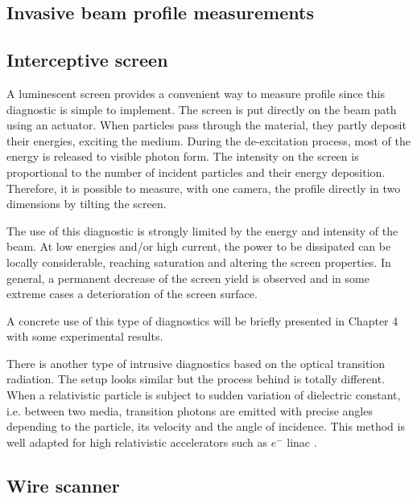 \begin{refsection}

  \section{Invasive beam profile measurements}
  \subsection{Interceptive screen}
  A luminescent screen provides a convenient way to measure profile since this diagnostic is simple to implement. The screen is put directly on the beam path using an actuator. When particles pass through the material, they partly deposit their energies, exciting the medium. During the de-excitation process, most of the energy is released to visible photon form. The intensity on the screen is proportional to the number of incident particles and their energy deposition. Therefore, it is possible to measure, with one camera, the profile directly in two dimensions by tilting the screen.

  The use of this diagnostic is strongly limited by the energy and intensity of the beam. At low energies and/or high current, the power to be dissipated can be locally considerable, reaching saturation and altering the screen properties. In general, a permanent decrease of the screen yield is observed \cite{Simon:IBIC2016-MOPG79} and in some extreme cases a deterioration of the screen surface.

  A concrete use of this type of diagnostics will be briefly presented in Chapter 4 with some experimental results.

  There is another type of intrusive diagnostics based on the optical transition radiation. The setup looks similar but the process behind is totally different. When a relativistic particle is subject to sudden variation of dielectric constant, i.e. between two media, transition photons are emitted with precise angles depending to the particle, its velocity and the angle of incidence. This method is well adapted for high relativistic accelerators such as $e^{-}$ \acrshort{linac} \cite{Nolle2009,Bolzon2013}.

  \subsection{Wire scanner}



\end{refsection}
